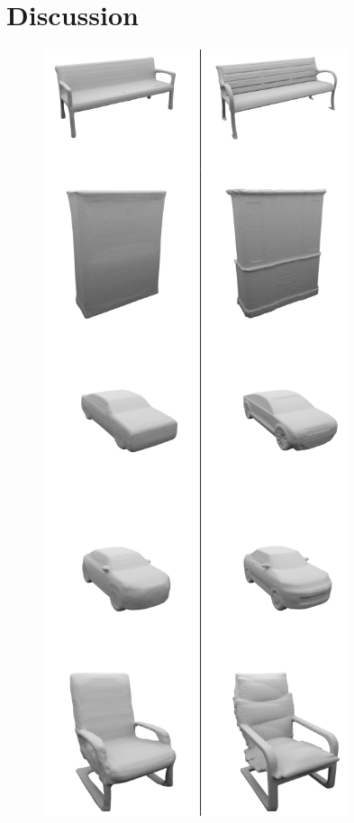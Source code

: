 \documentclass[11pt]{article}
\begin{document}
\section{Discussion}
\begin{figure}
\includegraphics[scale=0.4]{./benchImages/groundTruth.png}
\end{figure}
\end{document}
